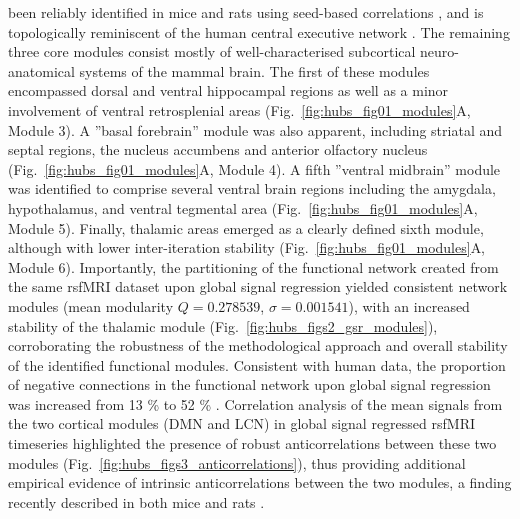 been reliably identified in mice and rats using seed-based correlations
\parencite{schwarz2013a, sforazzini2016}, and is topologically reminiscent of
the human central executive network \parencite{menon2011}.  The remaining three
core modules consist mostly of well-characterised subcortical neuro-anatomical
systems of the mammal brain.  The first of these modules encompassed dorsal and
ventral hippocampal regions as well as a minor involvement of ventral
retrosplenial areas (Fig.~\ref{fig:hubs_fig01_modules}A, Module 3).  A ''basal
forebrain'' module was also apparent, including striatal and septal regions, the
nucleus accumbens and anterior olfactory nucleus
(Fig.~\ref{fig:hubs_fig01_modules}A, Module 4). A fifth ''ventral midbrain''
module was identified to comprise several ventral brain regions including the
amygdala, hypothalamus, and ventral tegmental area
(Fig.~\ref{fig:hubs_fig01_modules}A, Module 5).  Finally, thalamic areas emerged
as a clearly defined sixth module, although with lower inter-iteration stability
(Fig.~\ref{fig:hubs_fig01_modules}A, Module 6).  Importantly, the partitioning
of the functional network created from the same rsfMRI dataset upon global
signal regression yielded consistent network modules (mean modularity $Q =
0.278539$, $\sigma = 0.001541$), with an increased stability of the thalamic
module (Fig.~\ref{fig:hubs_figs2_gsr_modules}), corroborating the robustness of
the methodological approach and overall stability of the identified functional
modules. Consistent with human data, the proportion of negative connections in
the functional network upon global signal regression was increased from 13 \% to
52 \% \parencite{murphy2009, weissenbacher2009}. Correlation analysis of  the
mean signals from the two cortical modules (DMN and LCN) in global signal
regressed rsfMRI timeseries highlighted the presence of robust anticorrelations
between these two modules (Fig.~\ref{fig:hubs_figs3_anticorrelations}), thus
providing additional empirical evidence of intrinsic anticorrelations between
the two modules, a finding recently described in both mice and rats
\parencite{schwarz2013a, sforazzini2016}.

